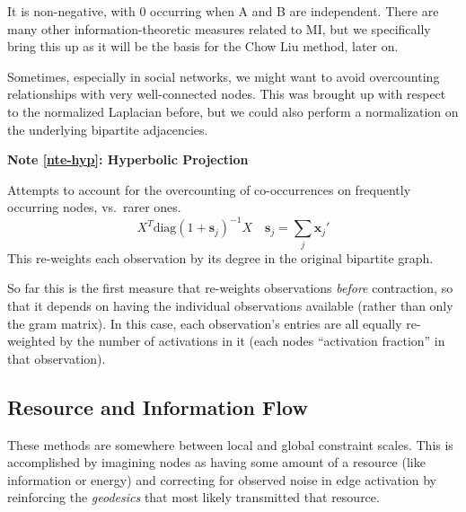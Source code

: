 \documentclass[%
	12pt,
		oneside,
		letterpaper
]{book}
\newcounter{quartocalloutnteno}
\newcommand{\quartocalloutnte}[1]{\refstepcounter{quartocalloutnteno}\label{#1}}
\begin{document}
It is non-negative, with 0 occurring when A and B are independent. There
are many other information-theoretic measures related to MI, but we
specifically bring this up as it will be the basis for the Chow Liu
method, later on.

Sometimes, especially in social networks, we might want to avoid
overcounting relationships with very well-connected nodes. This was
brought up with respect to the normalized Laplacian before, but we could
also perform a normalization on the underlying bipartite adjacencies.

\begin{tcolorbox}[enhanced jigsaw, opacityback=0, arc=.35mm, colback=white, colframe=quarto-callout-note-color-frame, toprule=.15mm, breakable, leftrule=.75mm, rightrule=.15mm, bottomrule=.15mm, left=2mm]

\quartocalloutnte{nte-hyp} 

\vspace{-3mm}\textbf{Note \ref*{nte-hyp}: Hyperbolic Projection}\vspace{3mm}

Attempts to account for the overcounting of co-occurrences on frequently
occurring nodes, vs.~rarer
ones.\autocite{Scientificcollaborationnetworks._Newman2001}
\[ X^T\text{diag}(1+\mathbf{s}_j)^{-1}X \quad \mathbf{s}_j = \sum_j{\mathbf{x}_j'}\]
This re-weights each observation by its degree in the original bipartite
graph.

\end{tcolorbox}

So far this is the first measure that re-weights observations
\emph{before} contraction, so that it depends on having the individual
observations available (rather than only the gram matrix). In this case,
each observation's entries are all equally re-weighted by the number of
activations in it (each nodes ``activation fraction'' in that
observation).

\subsection{Resource and Information
Flow}\label{resource-and-information-flow}

These methods are somewhere between local and global constraint scales.
This is accomplished by imagining nodes as having some amount of a
resource (like information or energy) and correcting for observed noise
in edge activation by reinforcing the \emph{geodesics} that most likely
transmitted that resource.
\end{document}
